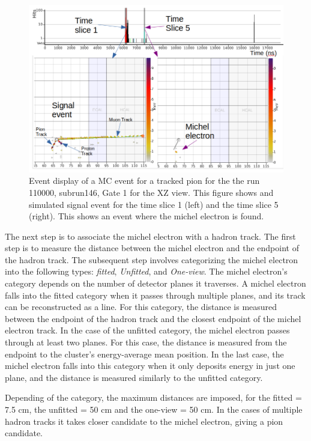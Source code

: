 \begin{itemize}
    \begin{figure}[!htb]
        \centering
        \includegraphics[scale=0.4]{Figures/Chapter4/DataSelection/EventDisplayMichelElectronRun110000SubRun146.png}
        \caption{Event display of a MC event for a tracked pion for the the run 110000, subrun146, Gate 1 for the XZ view. This figure shows and simulated signal event for the time slice 1 (left) and the time slice 5 (right). This shows an event where the michel electron is found. }
        \label{fig:Analysis:DataSelection:Cuts:Tracked:EventDisplayMETracked}
    \end{figure}

    The next step is to associate the michel electron with a hadron track. The first step is to measure the distance between the michel electron and the endpoint of the hadron track. The subsequent step involves categorizing the michel electron into the following types: \textit{fitted}, \textit{Unfitted}, and \textit{One-view}. The michel electron's category depends on the number of detector planes it traverses. A michel electron falls into the fitted category when it passes through multiple planes, and its track can be reconstructed as a line. For this category, the distance is measured between the endpoint of the hadron track and the closest endpoint of the michel electron track. In the case of the unfitted category, the michel electron passes through at least two planes. For this case, the distance is measured from the endpoint to the cluster's energy-average mean position. In the last case, the michel electron falls into this category when it only deposits energy in just one plane, and the distance is measured similarly to the unfitted category. 

    Depending of the category, the maximum distances are imposed, for the fitted = 7.5 cm, the unfitted = 50 cm and the one-view = 50 cm. In the cases of multiple hadron tracks it takes closer candidate to the michel electron, giving a pion candidate.
    



\end{itemize}
